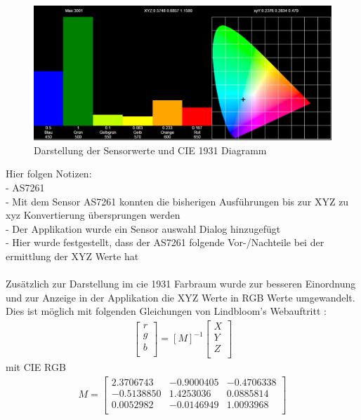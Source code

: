 \documentclass[11pt]{scrartcl}
\begin{document}
\begin{figure}[H]
    \begin{center}
        \includegraphics[width=\textwidth]{images/app_dummy_spectrum_with_xy.png}
    \end{center}
    \caption{Darstellung der Sensorwerte und CIE 1931 Diagramm}
\end{figure}
\noindent
{\color{red}
Hier folgen Notizen:\\
- AS7261\\
- Mit dem Sensor AS7261 konnten die bisherigen Ausführungen bis zur XYZ zu xyz Konvertierung übersprungen werden\\
- Der Applikation wurde ein Sensor auswahl Dialog hinzugefügt\\
- Hier wurde festgestellt, dass der AS7261 folgende Vor-/Nachteile bei der ermittlung der XYZ Werte hat\\}
\\
Zusätzlich zur Darstellung im \ac{cie} 1931 Farbraum wurde zur besseren Einordnung und zur Anzeige in der Applikation die XYZ Werte in RGB Werte
umgewandelt. Dies ist möglich mit folgenden Gleichungen von Lindbloom's Webauftritt \cite{lindbloom}:
\begin{align}\label{Equ:4}
    \left[ \begin{array}{r}
        r \\
        g \\
        b \\
    \end{array}\right]
    = [M]^{-1} \left[ \begin{array}{r}
        X \\
        Y \\
        Z \\
    \end{array}\right]
\end{align}
mit CIE RGB
\begin{align}\label{Equ:5}
    M = \left[ \begin{array}{rrr}
        2.3706743 & -0.9000405 & -0.4706338 \\
        -0.5138850 & 1.4253036 & 0.0885814 \\
        0.0052982 & -0.0146949 & 1.0093968 \\
    \end{array}\right]
\end{align}
\end{document}
